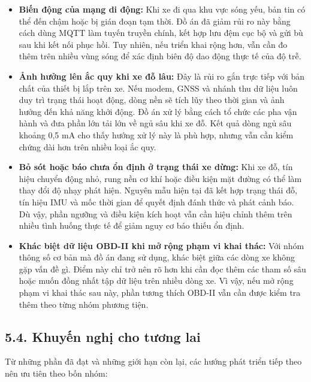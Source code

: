 \documentclass[a4paper]{extarticle}
\providecommand{\tightlist}{%
  \setlength{\itemsep}{0pt}\setlength{\parskip}{0pt}}
\begin{document}
\begin{itemize}
\tightlist
\item
  \textbf{Biến động của mạng di động:} Khi xe đi qua khu vực sóng yếu, bản tin có thể đến chậm hoặc bị gián đoạn tạm thời. Đồ án đã giảm rủi ro này bằng cách dùng MQTT làm tuyến truyền chính, kết hợp lưu đệm cục bộ và gửi bù sau khi kết nối phục hồi. Tuy nhiên, nếu triển khai rộng hơn, vẫn cần đo thêm trên nhiều vùng sóng để xác định biên độ dao động thực tế của độ trễ.
\item
  \textbf{Ảnh hưởng lên ắc quy khi xe đỗ lâu:} Đây là rủi ro gắn trực tiếp với bản chất của thiết bị lắp trên xe. Nếu modem, GNSS và nhánh thu dữ liệu luôn duy trì trạng thái hoạt động, dòng nền sẽ tích lũy theo thời gian và ảnh hưởng đến khả năng khởi động. Đồ án xử lý bằng cách tổ chức các pha vận hành và đưa phần lớn tải lớn về ngủ sâu khi xe đỗ. Kết quả dòng ngủ sâu khoảng 0,5 mA cho thấy hướng xử lý này là phù hợp, nhưng vẫn cần kiểm chứng dài hơn trên nhiều loại ắc quy.
\item
  \textbf{Bỏ sót hoặc báo chưa ổn định ở trạng thái xe dừng:} Khi xe đỗ, tín hiệu chuyển động nhỏ, rung nền cơ khí hoặc điều kiện mặt đường có thể làm thay đổi độ nhạy phát hiện. Nguyên mẫu hiện tại đã kết hợp trạng thái đỗ, tín hiệu IMU và mốc thời gian để quyết định đánh thức và phát cảnh báo. Dù vậy, phần ngưỡng và điều kiện kích hoạt vẫn cần hiệu chỉnh thêm trên nhiều tình huống thực tế để giảm nguy cơ báo thiếu ổn định.
\item
  \textbf{Khác biệt dữ liệu OBD-II khi mở rộng phạm vi khai thác:} Với nhóm thông số cơ bản mà đồ án đang sử dụng, khác biệt giữa các dòng xe không gặp vấn đề gì. Điểm này chỉ trở nên rõ hơn khi cần đọc thêm các tham số sâu hoặc muốn đồng nhất tập dữ liệu trên nhiều dòng xe. Vì vậy, nếu mở rộng phạm vi khai thác sau này, phần tương thích OBD-II vẫn cần được kiểm tra thêm theo từng nhóm phương tiện.
\end{itemize}

\subsection{5.4. Khuyến nghị cho tương lai}\label{khuyux1ebfn-nghux1ecb-cho-tux1b0ux1a1ng-lai}

Từ những phần đã đạt và những giới hạn còn lại, các hướng phát triển tiếp theo nên ưu tiên theo bốn nhóm:
\end{document}
